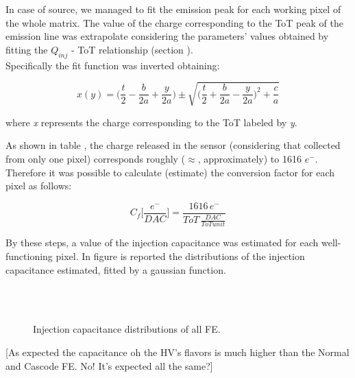 In case of  source, we managed to fit the emission peak for each working pixel of the whole matrix. The value of the charge corresponding to the ToT peak of the emission line was extrapolate considering the parameters' values obtained by fitting the $Q_{inj}$ - ToT relationship (section ). \\

Specifically the fit function  was inverted obtaining:

\begin{equation}
x(y) = \bigg(\frac{t}{2} - \frac{b}{2a} + \frac{y}{2a}\bigg) \pm \sqrt{\bigg(\frac{t}{2} + \frac{b}{2a} - \frac{y}{2a}\bigg)^{2} + \frac{c}{a}}
\end{equation}

where \textit{x} represents the charge corresponding to the ToT labeled by \textit{y}.

As shown in table , the charge released in the sensor (considering that collected from only one pixel) corresponds roughly ($\approx$, approximately) to 1616 $e^{-}$. Therefore it was possible to calculate (estimate) the conversion factor for each pixel as follows:

\begin{equation}
C_{f}\bigg[\frac{e^{-}}{DAC}\bigg] = \frac{1616 \, e^{-}}{ToT \, \frac{DAC}{ToT unit}}
\label{inj_cap}
\end{equation} 

By these steps, a value of the injection capacitance was estimated for each well-functioning pixel. In figure  is reported the distributions of the injection capacitance estimated, fitted by a gaussian function.

\begin{figure}
\centering
{}\quad
{}\\
\quad
{}\\
\caption{Injection capacitance distributions of all FE.}
\label{fig:cap_dist}
\end{figure} 

[As expected the capacitance oh the HV's flavors is much higher than the Normal and Cascode FE. No! It's expected all the same?] 

